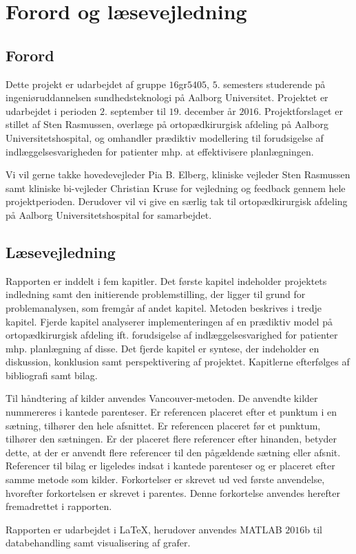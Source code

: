 \chapter*{Forord og læsevejledning}

\section*{Forord}
Dette projekt er udarbejdet af gruppe $16$gr$5405$, $5$. semesters studerende på ingeniøruddannelsen sundhedsteknologi på Aalborg Universitet. Projektet er udarbejdet i perioden $2$. september til $19$. december år $2016$. Projektforslaget er stillet af Sten Rasmussen, overlæge på ortopædkirurgisk afdeling på Aalborg Universitetshospital, og omhandler prædiktiv modellering til forudsigelse af indlæggelsesvarigheden for patienter mhp. at effektivisere planlægningen. 


Vi vil gerne takke hovedevejleder Pia B. Elberg, kliniske vejleder Sten Rasmussen samt kliniske bi-vejleder Christian Kruse for vejledning og feedback gennem hele projektperioden. Derudover vil vi give en særlig tak til ortopædkirurgisk afdeling på Aalborg Universitetshospital for samarbejdet. 


\section*{Læsevejledning}
Rapporten er inddelt i fem kapitler. Det første kapitel indeholder projektets indledning samt den initierende problemstilling, der ligger til grund for problemanalysen, som fremgår af andet kapitel. Metoden beskrives i tredje kapitel. Fjerde kapitel analyserer implementeringen af en prædiktiv model på ortopædkirurgisk afdeling ift. forudsigelse af indlæggelsesvarighed for patienter mhp. planlægning af disse. Det fjerde kapitel er syntese, der indeholder en diskussion, konklusion samt perspektivering af projektet. Kapitlerne efterfølges af bibliografi samt bilag. 


Til håndtering af kilder anvendes Vancouver-metoden. De anvendte kilder nummereres i kantede parenteser. Er referencen placeret efter et punktum i en sætning, tilhører den hele afsnittet. Er referencen placeret før et punktum, tilhører den sætningen. Er der placeret flere referencer efter hinanden, betyder dette, at der er anvendt flere referencer til den pågældende sætning eller afsnit. Referencer til bilag er ligeledes indsat i kantede parenteser og er placeret efter samme metode som kilder. Forkortelser er skrevet ud ved første anvendelse, hvorefter forkortelsen er skrevet i parentes. Denne forkortelse anvendes herefter fremadrettet i rapporten. 

Rapporten er udarbejdet i \LaTeX, herudover anvendes MATLAB $2016$b til databehandling samt visualisering af grafer. 
